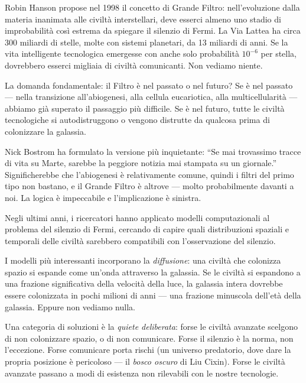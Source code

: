 \documentclass[12pt,a4paper,openany]{book}
\newcommand{\sezione}[1]{\vspace{1.2em}{\large\bfseries #1}\vspace{0.5em}\par}
\begin{document}
\sezione{Il Grande Filtro}

Robin Hanson propose nel 1998 il concetto di Grande Filtro: nell'evoluzione dalla materia inanimata alle civiltà interstellari, deve esserci almeno uno stadio di improbabilità così estrema da spiegare il silenzio di Fermi. La Via Lattea ha circa 300 miliardi di stelle, molte con sistemi planetari, da 13 miliardi di anni. Se la vita intelligente tecnologica emergesse con anche solo probabilità $10^{-6}$ per stella, dovrebbero esserci migliaia di civiltà comunicanti. Non vediamo niente.

La domanda fondamentale: il Filtro è nel passato o nel futuro? Se è nel passato — nella transizione all'abiogenesi, alla cellula eucariotica, alla multicellularità — abbiamo già superato il passaggio più difficile. Se è nel futuro, tutte le civiltà tecnologiche si autodistruggono o vengono distrutte da qualcosa prima di colonizzare la galassia.

Nick Bostrom ha formulato la versione più inquietante: ``Se mai trovassimo tracce di vita su Marte, sarebbe la peggiore notizia mai stampata su un giornale.'' Significherebbe che l'abiogenesi è relativamente comune, quindi i filtri del primo tipo non bastano, e il Grande Filtro è altrove — molto probabilmente davanti a noi. La logica è impeccabile e l'implicazione è sinistra.

\sezione{L'astrobiologia computazionale: modelli del fermento silenzioso}

Negli ultimi anni, i ricercatori hanno applicato modelli computazionali al problema del silenzio di Fermi, cercando di capire quali distribuzioni spaziali e temporali delle civiltà sarebbero compatibili con l'osservazione del silenzio.

I modelli più interessanti incorporano la \textit{diffusione}: una civiltà che colonizza spazio si espande come un'onda attraverso la galassia. Se le civiltà si espandono a una frazione significativa della velocità della luce, la galassia intera dovrebbe essere colonizzata in pochi milioni di anni --- una frazione minuscola dell'età della galassia. Eppure non vediamo nulla.

Una categoria di soluzioni è la \textit{quiete deliberata}: forse le civiltà avanzate scelgono di non colonizzare spazio, o di non comunicare. Forse il silenzio è la norma, non l'eccezione. Forse comunicare porta rischi (un universo predatorio, dove dare la propria posizione è pericoloso --- il \textit{bosco oscuro} di Liu Cixin). Forse le civiltà avanzate passano a modi di esistenza non rilevabili con le nostre tecnologie.
\end{document}
